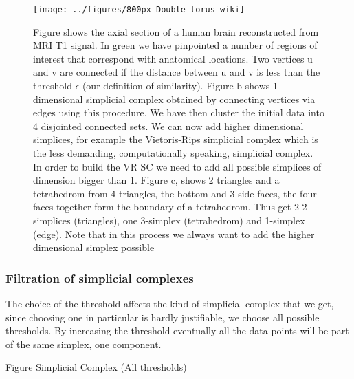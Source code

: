 \documentclass[onecollarge,runningheads]{svjour2}
\begin{document}
\begin{figure}[h]
        \centering
        \texttt{[image: ../figures/800px-Double\_torus\_wiki]}
        \caption{Figure shows the axial section of a human brain reconstructed from MRI T1 signal. In green we have pinpointed a number of regions of interest that correspond with anatomical locations. Two vertices u and v are connected if the distance between u and v is less than the threshold $\epsilon$ (our definition of similarity).  Figure b shows 1-dimensional simplicial complex obtained by connecting vertices via edges using this procedure. We have then cluster the initial data into 4 disjointed connected sets. We can now add higher dimensional simplices, for example the Vietoris-Rips simplicial complex which is the less demanding, computationally speaking, simplicial complex. In order to build the VR SC we need to add all possible simplices of dimension bigger than 1. Figure c, shows 2 triangles and a tetrahedrom from 4 triangles, the bottom and 3 side faces, the four faces together form the boundary of a tetrahedrom. Thus get 2 2-simplices (triangles), one 3-simplex (tetrahedrom) and 1-simplex (edge). Note that in this process we always want to add the higher dimensional simplex possible}
\label{fig:vrcomplex}
\end{figure}

\subsubsection{Filtration of simplicial complexes} 
The choice of the threshold affects the kind of simplicial complex that we get, since choosing one in particular is hardly justifiable, we choose all possible thresholds. By increasing the threshold eventually all the data points will be part of the same simplex, one component.

Figure Simplicial Complex (All thresholds)
\end{document}
